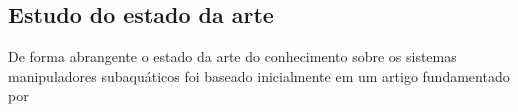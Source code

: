 

\subsection{Estudo do estado da arte}
\label{sec:sotamani}
De forma abrangente o estado da arte do conhecimento sobre os sistemas manipuladores subaquáticos foi baseado inicialmente em um artigo fundamentado por

